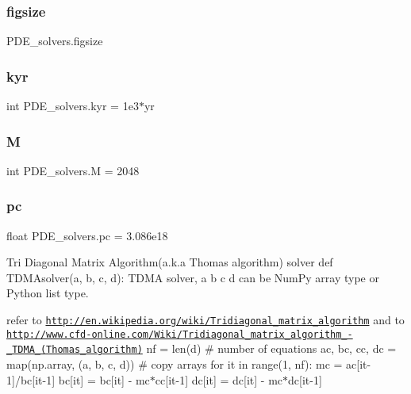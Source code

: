 \subsubsection{\texorpdfstring{figsize}{figsize}}
{\footnotesize\ttfamily P\+D\+E\+\_\+solvers.\+figsize}

\mbox{\label{namespacePDE__solvers_a17e611d575d9a8bda46ea6b596138f12}} 
\subsubsection{\texorpdfstring{kyr}{kyr}}
{\footnotesize\ttfamily int P\+D\+E\+\_\+solvers.\+kyr = 1e3$\ast$yr}

\mbox{\label{namespacePDE__solvers_a9d6fca7c2abdff4c2c7feec55d437940}} 
\subsubsection{\texorpdfstring{M}{M}}
{\footnotesize\ttfamily int P\+D\+E\+\_\+solvers.\+M = 2048}

\mbox{\label{namespacePDE__solvers_a71c07d7118cdda8c71573599545d0017}} 
\subsubsection{\texorpdfstring{pc}{pc}}
{\footnotesize\ttfamily float P\+D\+E\+\_\+solvers.\+pc = 3.\+086e18}



Tri Diagonal Matrix Algorithm(a.\+k.\+a Thomas algorithm) solver def T\+D\+M\+Asolver(a, b, c, d)\+: \textquotesingle{}\textquotesingle{}\textquotesingle{} T\+D\+MA solver, a b c d can be Num\+Py array type or Python list type. 

refer to \href{http://en.wikipedia.org/wiki/Tridiagonal_matrix_algorithm}{\tt http\+://en.\+wikipedia.\+org/wiki/\+Tridiagonal\+\_\+matrix\+\_\+algorithm} and to \href{http://www.cfd-online.com/Wiki/Tridiagonal_matrix_algorithm_-_TDMA_(Thomas_algorithm)}{\tt http\+://www.\+cfd-\/online.\+com/\+Wiki/\+Tridiagonal\+\_\+matrix\+\_\+algorithm\+\_\+-\/\+\_\+\+T\+D\+M\+A\+\_\+(\+Thomas\+\_\+algorithm)} \textquotesingle{}\textquotesingle{}\textquotesingle{} nf = len(d) \# number of equations ac, bc, cc, dc = map(np.\+array, (a, b, c, d)) \# copy arrays for it in range(1, nf)\+: mc = ac\mbox{[}it-\/1\mbox{]}/bc\mbox{[}it-\/1\mbox{]} bc\mbox{[}it\mbox{]} = bc\mbox{[}it\mbox{]} -\/ mc$\ast$cc\mbox{[}it-\/1\mbox{]} dc\mbox{[}it\mbox{]} = dc\mbox{[}it\mbox{]} -\/ mc$\ast$dc\mbox{[}it-\/1\mbox{]}

